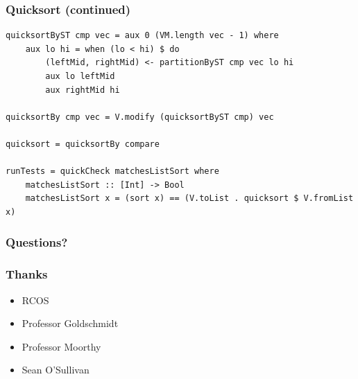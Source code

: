 \documentclass{beamer}
\begin{document}
\begin{frame}[fragile]
\frametitle{Quicksort (continued)}
\begin{Verbatim}[frame=single, fontsize=\scriptsize]
quicksortByST cmp vec = aux 0 (VM.length vec - 1) where
    aux lo hi = when (lo < hi) $ do
        (leftMid, rightMid) <- partitionByST cmp vec lo hi
        aux lo leftMid
        aux rightMid hi

quicksortBy cmp vec = V.modify (quicksortByST cmp) vec

quicksort = quicksortBy compare

runTests = quickCheck matchesListSort where 
    matchesListSort :: [Int] -> Bool
    matchesListSort x = (sort x) == (V.toList . quicksort $ V.fromList x)
\end{Verbatim}
\end{frame}

\begin{frame}[fragile]
\frametitle{Questions?}
\end{frame}

\begin{frame}[fragile]
\frametitle{Thanks}
\begin{itemize}
\item RCOS
\item Professor Goldschmidt
\item Professor Moorthy
\item Sean O'Sullivan
\end{itemize}
\end{frame}
\end{document}
